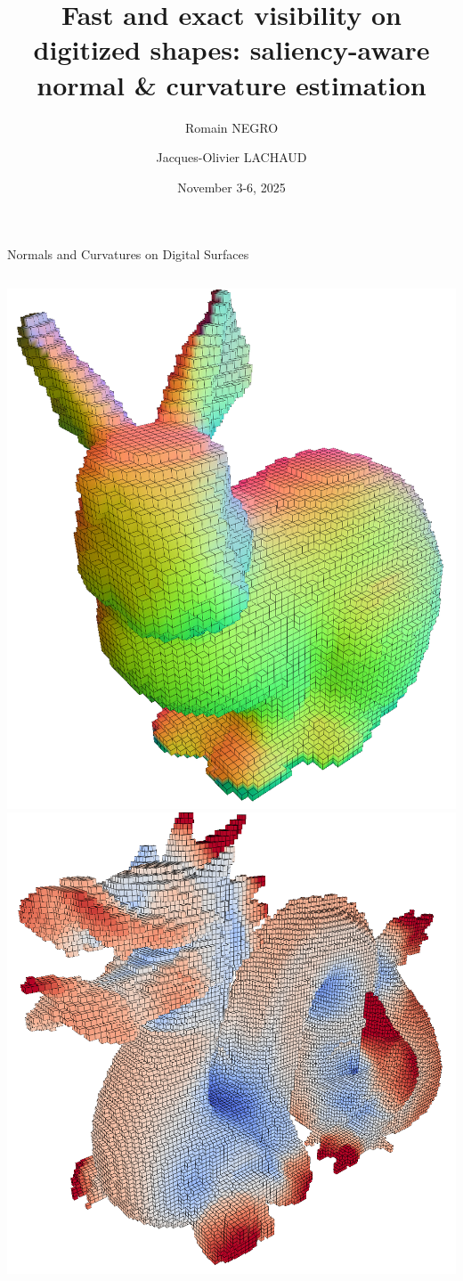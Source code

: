 \documentclass[11pt]{beamer}
\title[Visibility-based normals \& curvature]{Fast and exact visibility on digitized shapes: saliency-aware normal \& curvature estimation}
\author{Romain NEGRO \and Jacques-Olivier LACHAUD}
\institute{DGMM 2025}
\date{November 3-6, 2025}
\begin{document}
    \begin{frame}
        \titlepage
    \end{frame}

    \begin{frame}{Normals and Curvatures on Digital Surfaces}
        \centering
        \begin{columns}
            \includegraphics[width=\linewidth]{pictures/normal_digital_surf}
            \includegraphics[width=\linewidth]{pictures/Hcurv_digital_surface}
        \end{columns}
    \end{frame}
\end{document}
